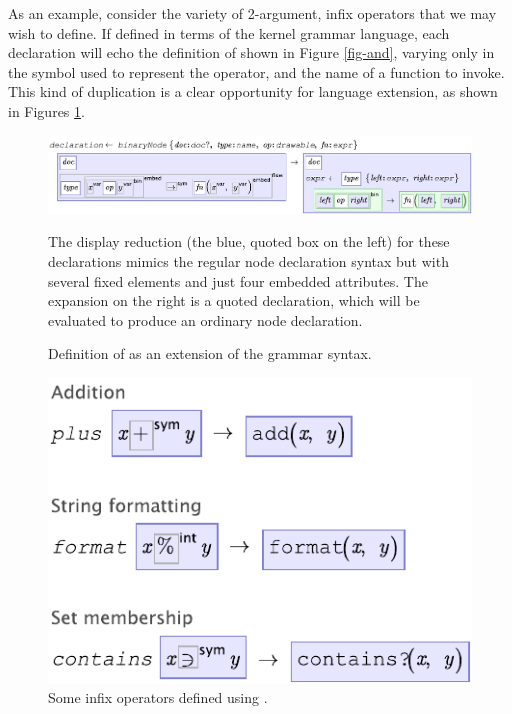 As an example, consider the variety of 2-argument, infix operators that we may wish to define. If defined in terms of the kernel grammar language, each declaration will echo the definition of  shown in Figure \ref{fig-and}, varying only in the symbol used to represent the operator, and the name of a function to invoke. This kind of duplication is a clear opportunity for language extension, as shown in Figures \ref{fig-binary}.

\begin{figure}[th]
	\begin{center}
	\includegraphics[scale=0.8]{src/image/binaryNode.pdf}
	\end{center}

	The display reduction (the blue, quoted box on the left) for these declarations mimics the regular node declaration syntax but with several fixed elements and just four embedded attributes. The expansion on the right is a quoted declaration, which will be evaluated to produce an ordinary node declaration.
  
	\caption{Definition of  as an extension of the grammar syntax.}
	\label{fig-binary}
\end{figure}

\begin{figure}[th]
	\begin{center}
	\includegraphics[scale=0.8]{src/image/binary.pdf}
	\end{center}

  \caption{Some infix operators defined using .}
  \label{fig-binary-examples}
\end{figure}

